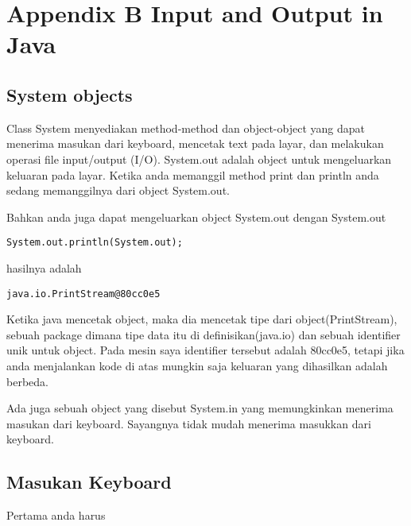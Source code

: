 \chapter{Appendix B Input and Output in Java}
\section{System objects} %
Class System menyediakan method-method dan object-object yang dapat menerima masukan dari keyboard, mencetak text pada layar, dan melakukan operasi file input/output (I/O). System.out adalah object untuk mengeluarkan keluaran pada layar. Ketika anda memanggil method print dan println anda sedang memanggilnya dari object System.out.

Bahkan anda juga dapat mengeluarkan object System.out dengan System.out

\begin{lstlisting}
System.out.println(System.out);
\end{lstlisting}

hasilnya adalah
\begin{lstlisting}
java.io.PrintStream@80cc0e5
\end{lstlisting}

Ketika java mencetak object, maka dia mencetak tipe dari object(PrintStream), sebuah package dimana tipe data itu di definisikan(java.io) dan sebuah identifier unik untuk object. Pada mesin saya identifier tersebut adalah 80cc0e5, tetapi jika anda menjalankan kode di atas mungkin saja keluaran yang dihasilkan adalah berbeda.

Ada juga sebuah object yang disebut System.in yang memungkinkan menerima masukan dari keyboard. Sayangnya tidak mudah menerima masukkan dari keyboard.

\section{Masukan Keyboard}
Pertama anda harus 